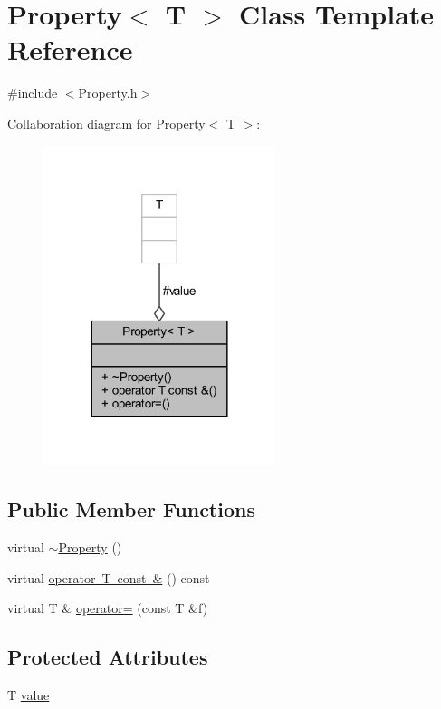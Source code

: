 \hypertarget{classProperty}{}\section{Property$<$ T $>$ Class Template Reference}
\label{classProperty}


{\ttfamily \#include $<$Property.\+h$>$}



Collaboration diagram for Property$<$ T $>$\+:
\nopagebreak
\begin{figure}[H]
\begin{center}
\leavevmode
\includegraphics[width=192pt]{classProperty__coll__graph}
\end{center}
\end{figure}
\subsection*{Public Member Functions}
\begin{DoxyCompactItemize}
\item 
virtual \mbox{\hyperlink{classProperty_a07aa35ff914a89ddfa870beb39ed2282}{$\sim$\+Property}} ()
\item 
virtual \mbox{\hyperlink{classProperty_ac6e42e7bc8389563c1a146ada975537d}{operator T const \&}} () const
\item 
virtual T \& \mbox{\hyperlink{classProperty_a5544ed373da5ea5aee46217ebed97eb7}{operator=}} (const T \&f)
\end{DoxyCompactItemize}
\subsection*{Protected Attributes}
\begin{DoxyCompactItemize}
\item 
T \mbox{\hyperlink{classProperty_a2be7b50eb1b49c6fbbb434de219e51fd}{value}}
\end{DoxyCompactItemize}



